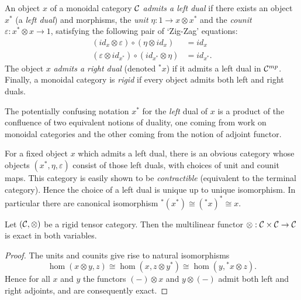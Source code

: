 \documentclass{amsart}
\begin{document}
\begin{definition}
	An object $x$ of a monoidal category $\mathcal C$ {\em admits a left dual} if there exists an object $x^*$ (a {\em left dual}) and morphisms, the {\em unit} $\eta: 1 \to x \otimes x^*$ and the {\em counit} $\varepsilon: x^* \otimes x \to 1$, satisfying the following pair of `Zig-Zag' equations:
	\begin{align*}
		(id_{x} \otimes \varepsilon  ) \circ (  \eta \otimes id_{x}) &= id_{x} \\
		(\varepsilon \otimes id_{x^*}) \circ (id_{x^*} \otimes \eta) &= id_{x^*}.
	\end{align*}
The object $x$ {\em admits a right dual} (denoted ${}^*x$) if it admits a left dual in $\mathcal C^{mp}$. Finally, a monoidal category is {\em rigid} if every object admits both left and right duals. 
\end{definition}

\begin{remark}
	The potentially confusing notation $x^*$ for the {\em left} dual of $x$ is a product of the confluence of two equivalent notions of duality, one coming from work on monoidal categories and the other coming from the notion of adjoint functor.  
\end{remark}

\begin{remark}
	For a fixed object $x$ which admits a left dual, there is an obvious category whose objects $(x^*, \eta, \varepsilon)$ consist of those left duals, with choices of unit and counit maps. This category is easily shown to be {\em contractible} (equivalent to the terminal category). Hence the choice of a left dual is unique up to unique isomorphism. In particular there are canonical isomorphism ${}^*(x^*) \cong ({}^*x)^* \cong x$. 
\end{remark}

\begin{lemma}
	Let $(\mathcal C, \otimes)$ be a rigid tensor category. Then the multilinear functor $\otimes: \mathcal C \times \mathcal C \to \mathcal C$ is exact in both variables. 
\end{lemma}

\begin{proof}
	The units and counits give rise to natural isomorphisms
 \begin{equation*}
 	\hom(x \otimes y, z) \cong \hom( x, z \otimes y^*) \cong \hom(y, {}^*x \otimes z).
 \end{equation*}
	Hence for all $x$ and $y$ the functors $(-)\otimes x$ and $y \otimes (-)$ admit both left and right adjoints, and are consequently exact. 
\end{proof}
\end{document}
